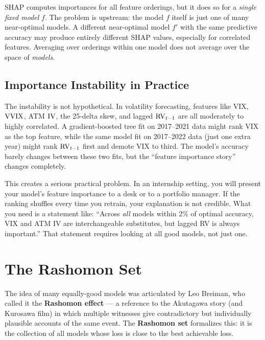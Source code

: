 \begin{intuition}
SHAP computes importances for all feature orderings, but it does so for
a \emph{single fixed model} $f$.  The problem is upstream: the model $f$
itself is just one of many near-optimal models.  A different near-optimal
model $f'$ with the same predictive accuracy may produce entirely different
SHAP values, especially for correlated features.  Averaging over orderings
within one model does not average over the space of \emph{models}.
\end{intuition}

\subsection{Importance Instability in Practice}

The instability is not hypothetical.  In volatility forecasting, features
like VIX, $\operatorname{VVIX}$, ATM $\operatorname{IV}$, the 25-delta skew, and lagged $\operatorname{RV}_{t-1}$
are all moderately to highly correlated.  A gradient-boosted tree fit on
2017--2021 data might rank VIX as the top feature, while the same model fit on
2017--2022 data (just one extra year) might rank $\operatorname{RV}_{t-1}$ first and
demote VIX to third.  The model's accuracy barely changes between these two
fits, but the ``feature importance story'' changes completely.

This creates a serious practical problem.  In an internship setting, you will
present your model's feature importance to a desk or to a portfolio manager.
If the ranking shuffles every time you retrain, your explanation is not
credible.  What you need is a statement like: ``Across \emph{all} models
within 2\% of optimal accuracy, VIX and ATM IV are interchangeable
substitutes, but lagged RV is always important.''  That statement requires
looking at all good models, not just one.


\section{The Rashomon Set}\label{sec:rashomon:set}

The idea of many equally-good models was articulated by Leo Breiman, who
called it the \textbf{Rashomon effect} --- a reference to the Akutagawa story
(and Kurosawa film) in which multiple witnesses give contradictory but
individually plausible accounts of the same event.  The \textbf{Rashomon set}
formalizes this: it is the collection of all models whose loss is close to
the best achievable loss.


